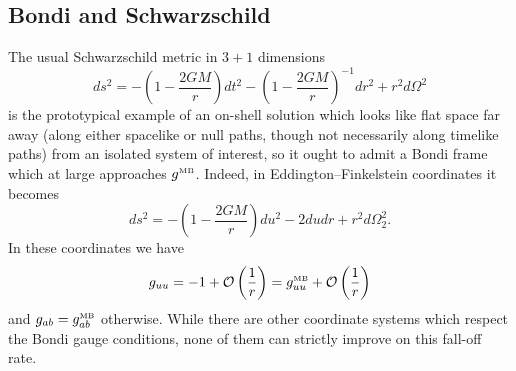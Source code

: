 \documentclass[11pt,letterpaper]{article}
\newcommand{\LP}{\left(}
\newcommand{\RP}{\right)}
\newcommand{\mc}[1]{\mathcal{#1}}
\begin{document}
\subsection{Bondi and Schwarzschild}
The usual Schwarzschild metric in $3+1$ dimensions
\begin{equation}
ds^2 = - \LP 1 - \frac{2GM}{r} \RP dt^2 - \LP 1 - \frac{2GM}{r} \RP^{-1} dr^2 + r^2 d \Omega^2
\end{equation}
is the prototypical example of an on-shell solution which looks like flat space far away (along either spacelike or null paths, though not necessarily along timelike paths) from an isolated system of interest, so it ought to admit a Bondi frame which at large approaches $g^{\mbox{\tiny{MB}}}$. Indeed, in Eddington–Finkelstein coordinates it becomes \begin{equation}
ds^2 = - \LP 1 - \frac{2GM}{r} \RP du^2 - 2 du dr + r^2 d \Omega_2^2.
\end{equation}
In these coordinates we have \begin{equation}
g_{uu} = -1 + \mc{O} \LP \frac{1}{r} \RP = g_{uu}^{\mbox{\tiny{MB}}} + \mc{O} \LP \frac{1}{r} \RP
\end{equation}
and $g_{ab} = g_{ab}^{\mbox{\tiny{MB}}}$ otherwise. While there are other coordinate systems which respect the Bondi gauge conditions, none of them can strictly improve on this fall-off rate.
\end{document}
